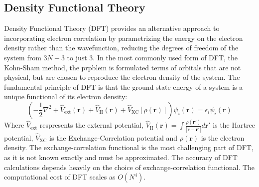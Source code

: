 \subsection{Density Functional Theory}
Density Functional Theory (DFT) provides an alternative approach to incorporating electron correlation by parametrizing the energy on the electron density rather than the wavefunction, reducing the degrees of freedom of the system from $3N-3$ to just $3$. In the most commonly used form of DFT, the Kohn-Sham method, the prpblem is formulated terms of orbitals that are not physical, but are chosen to reproduce the electron density of the system. The fundamental principle of DFT is that the ground state energy of a system is a unique functional of its electron density:
\begin{equation}\label{eq:KSDFT}
    \left( -\frac{1}{2} \nabla^2 + \hat{V}_{\mathrm{ext}}(\mathbf{r}) + \hat{V}_\mathrm{H}(\mathbf{r}) + \hat{V}_{\mathrm{XC}}[\rho(\mathbf{r})] \right) \psi_i(\mathbf{r}) = \epsilon_i \psi_i(\mathbf{r})
\end{equation}
Where $\hat{V}_{\mathrm{ext}}$ respresents the external potential, $\hat{V}_\mathrm{H}(\mathbf{r}) = \int \frac{\rho(\mathbf{r}')}{|\mathbf{r} - \mathbf{r}'|} d\mathbf{r}'$ is the Hartree potential, $\hat{V}_{\mathrm{XC}}$ is the Exchange-Correlation potential and $\rho(\mathbf{r})$ is the electron density. The exchange-correlation functional is the most challenging part of DFT, as it is not known exactly and must be approximated. The accuracy of DFT calculations depends heavily on the choice of exchange-correlation functional. The computational cost of DFT scales as $O(N^4)$.

